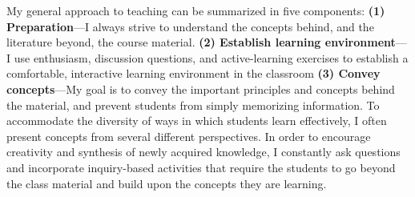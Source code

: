 My general approach to teaching can be summarized in five components:
\textbf{(1) Preparation}---I always strive to understand the concepts behind,
and the literature beyond, the course material.
\textbf{(2) Establish learning environment}---I use enthusiasm, discussion
questions, and active-learning exercises to establish a comfortable,
interactive learning environment in the classroom 
\textbf{(3) Convey concepts}---My goal is to convey the important principles
and concepts behind the material, and prevent students from simply memorizing
information.
To accommodate the diversity of ways in which students learn effectively, I
often present concepts from several different perspectives.
In order to encourage creativity and synthesis of newly acquired knowledge,
I constantly ask questions and incorporate inquiry-based activities that
require the students to go beyond the class material and build upon the
concepts they are learning.
